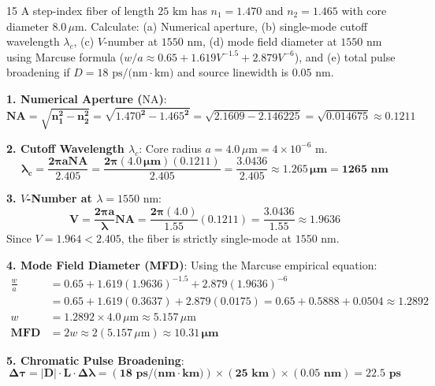 \begin{theoryq}{15}
A step-index fiber of length $25\text{ km}$ has $n_1 = 1.470$ and $n_2 = 1.465$ with core diameter $8.0\,\mu\text{m}$. Calculate: (a) Numerical aperture, (b) single-mode cutoff wavelength $\lambda_c$, (c) $V$-number at $1550\text{ nm}$, (d) mode field diameter at $1550\text{ nm}$ using Marcuse formula ($w/a \approx 0.65 + 1.619 V^{-1.5} + 2.879 V^{-6}$), and (e) total pulse broadening if $D = 18\text{ ps/(nm}\cdot\text{km)}$ and source linewidth is $0.05\text{ nm}$.
\end{theoryq}
\begin{theorysol}
\textbf{1. Numerical Aperture ($\text{NA}$)}:
\begin{equation}
\mathbf{\text{NA} = \sqrt{n_1^2 - n_2^2} = \sqrt{1.470^2 - 1.465^2} = \sqrt{2.1609 - 2.146225} = \sqrt{0.014675} \approx 0.1211}
\end{equation}

\textbf{2. Cutoff Wavelength $\lambda_c$}:
Core radius $a = 4.0\,\mu\text{m} = 4 \times 10^{-6}\text{ m}$.
\begin{equation}
\mathbf{\lambda_c = \frac{2\pi a \text{NA}}{2.405} = \frac{2\pi (4.0\,\mu\text{m})(0.1211)}{2.405} = \frac{3.0436}{2.405} \approx 1.265\,\mu\text{m} = 1265\text{ nm}}
\end{equation}

\textbf{3. $V$-Number at $\lambda = 1550\text{ nm}$}:
\begin{equation}
\mathbf{V = \frac{2\pi a}{\lambda}\text{NA} = \frac{2\pi (4.0)}{1.55}(0.1211) = \frac{3.0436}{1.55} \approx 1.9636}
\end{equation}
Since $V = 1.964 < 2.405$, the fiber is strictly single-mode at $1550\text{ nm}$.

\textbf{4. Mode Field Diameter (MFD)}:
Using the Marcuse empirical equation:
\begin{align*}
\frac{w}{a} &= 0.65 + 1.619(1.9636)^{-1.5} + 2.879(1.9636)^{-6} \\
&= 0.65 + 1.619(0.3637) + 2.879(0.0175) = 0.65 + 0.5888 + 0.0504 \approx 1.2892 \\
w &= 1.2892 \times 4.0\,\mu\text{m} \approx 5.157\,\mu\text{m} \\
\mathbf{\text{MFD}} &= 2w \approx 2(5.157\,\mu\text{m}) \approx \mathbf{10.31\,\mu\text{m}}
\end{align*}

\textbf{5. Chromatic Pulse Broadening}:
\begin{equation}
\mathbf{\Delta\tau = |D| \cdot L \cdot \Delta\lambda = (18\text{ ps/(nm}\cdot\text{km)}) \times (25\text{ km}) \times (0.05\text{ nm}) = 22.5\text{ ps}}
\end{equation}
\end{theorysol}
\vspace{4mm}


